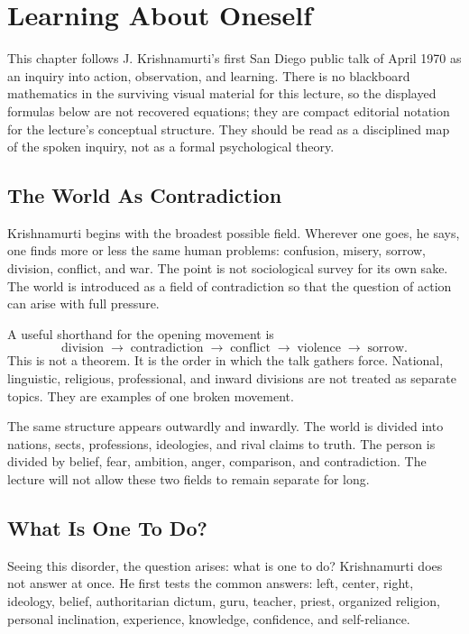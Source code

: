 \chapter{Learning About Oneself}

This chapter follows J. Krishnamurti's first San Diego public talk of April 1970 as an inquiry into action, observation, and learning. There is no blackboard mathematics in the surviving visual material for this lecture, so the displayed formulas below are not recovered equations; they are compact editorial notation for the lecture's conceptual structure. They should be read as a disciplined map of the spoken inquiry, not as a formal psychological theory.

\section{The World As Contradiction}

Krishnamurti begins with the broadest possible field. Wherever one goes, he says, one finds more or less the same human problems: confusion, misery, sorrow, division, conflict, and war. The point is not sociological survey for its own sake. The world is introduced as a field of contradiction so that the question of action can arise with full pressure.

A useful shorthand for the opening movement is
\begin{equation}
\text{division}
\;\longrightarrow\;
\text{contradiction}
\;\longrightarrow\;
\text{conflict}
\;\longrightarrow\;
\text{violence}
\;\longrightarrow\;
\text{sorrow}.
\end{equation}
This is not a theorem. It is the order in which the talk gathers force. National, linguistic, religious, professional, and inward divisions are not treated as separate topics. They are examples of one broken movement.

The same structure appears outwardly and inwardly. The world is divided into nations, sects, professions, ideologies, and rival claims to truth. The person is divided by belief, fear, ambition, anger, comparison, and contradiction. The lecture will not allow these two fields to remain separate for long.

\section{What Is One To Do?}

Seeing this disorder, the question arises: what is one to do? Krishnamurti does not answer at once. He first tests the common answers: left, center, right, ideology, belief, authoritarian dictum, guru, teacher, priest, organized religion, personal inclination, experience, knowledge, confidence, and self-reliance.

